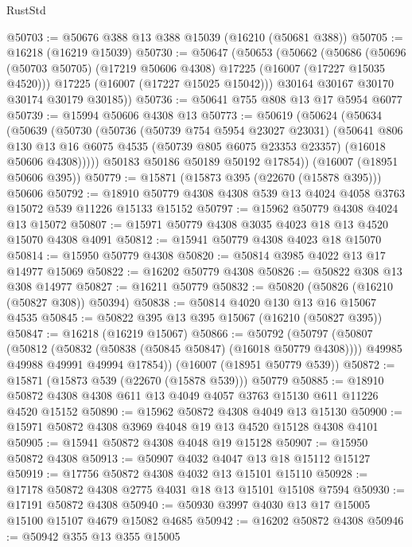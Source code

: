 \begin{lexlean}{RustStd}
\begin{coremodule}
@50703 := @50676 @388 @13 @388 @15039 (@16210 (@50681 @388))
@50705 := @16218 (@16219 @15039)
@50730 := @50647
    (@50653
      (@50662
        (@50686
          (@50696 (@50703 @50705) (@17219 @50606 @4308) @17225 (@16007 (@17227 @15035 @4520)))
          @17225
          (@16007 (@17227 @15025 @15042)))
        @30164
        @30167
        @30170
        @30174
        @30179
        @30185))
@50736 := @50641 @755 @808 @13 @17 @5954 @6077
@50739 := @15994 @50606 @4308 @13
@50773 := @50619
    (@50624
      (@50634
        (@50639
          (@50730
            (@50736
              (@50739 @754 @5954 @23027 @23031)
              (@50641
                @806
                @130
                @13
                @16
                @6075
                @4535
                (@50739 @805 @6075 @23353 @23357)
                (@16018 @50606 @4308)))))
        @50183
        @50186
        @50189
        @50192
        @17854))
    (@16007 (@18951 @50606 @395))
@50779 := @15871 (@15873 @395 (@22670 (@15878 @395))) @50606
@50792 := @18910 @50779 @4308 @4308 @539 @13 @4024 @4058 @3763 @15072 @539 @11226 @15133 @15152
@50797 := @15962 @50779 @4308 @4024 @13 @15072
@50807 := @15971 @50779 @4308 @3035 @4023 @18 @13 @4520 @15070 @4308 @4091
@50812 := @15941 @50779 @4308 @4023 @18 @15070
@50814 := @15950 @50779 @4308
@50820 := @50814 @3985 @4022 @13 @17 @14977 @15069
@50822 := @16202 @50779 @4308
@50826 := @50822 @308 @13 @308 @14977
@50827 := @16211 @50779
@50832 := @50820 (@50826 (@16210 (@50827 @308)) @50394)
@50838 := @50814 @4020 @130 @13 @16 @15067 @4535
@50845 := @50822 @395 @13 @395 @15067 (@16210 (@50827 @395))
@50847 := @16218 (@16219 @15067)
@50866 := @50792
    (@50797
      (@50807
        (@50812 (@50832 (@50838 (@50845 @50847) (@16018 @50779 @4308))))
        @49985
        @49988
        @49991
        @49994
        @17854))
    (@16007 (@18951 @50779 @539))
@50872 := @15871 (@15873 @539 (@22670 (@15878 @539))) @50779
@50885 := @18910 @50872 @4308 @4308 @611 @13 @4049 @4057 @3763 @15130 @611 @11226 @4520 @15152
@50890 := @15962 @50872 @4308 @4049 @13 @15130
@50900 := @15971 @50872 @4308 @3969 @4048 @19 @13 @4520 @15128 @4308 @4101
@50905 := @15941 @50872 @4308 @4048 @19 @15128
@50907 := @15950 @50872 @4308
@50913 := @50907 @4032 @4047 @13 @18 @15112 @15127
@50919 := @17756 @50872 @4308 @4032 @13 @15101 @15110
@50928 := @17178 @50872 @4308 @2775 @4031 @18 @13 @15101 @15108 @7594
@50930 := @17191 @50872 @4308
@50940 := @50930 @3997 @4030 @13 @17 @15005 @15100 @15107 @4679 @15082 @4685
@50942 := @16202 @50872 @4308
@50946 := @50942 @355 @13 @355 @15005

\end{coremodule}
\end{lexlean}

